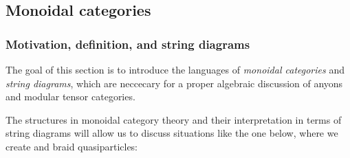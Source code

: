 




\subsection{Monoidal categories}

\subsubsection{Motivation, definition, and string diagrams}

The goal of this section is to introduce the languages of {\em monoidal categories} and {\em string diagrams}, which are neccecary for a proper algebraic discussion of anyons and modular tensor categories.

The structures in monoidal category theory and their interpretation in terms of string diagrams will allow us to discuss situations like the one below, where we create and braid quasiparticles:

